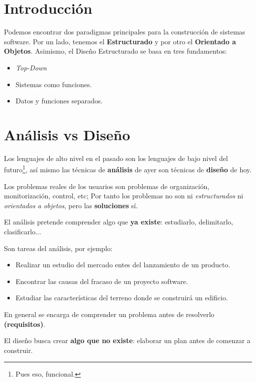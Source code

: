 

\section{Introducción}

Podemos encontrar dos paradigmas principales para la construcción de sistemas
software. Por un lado, tenemos el \textbf{Estructurado} y por otro el
\textbf{Orientado a Objetos}. Asimismo, el Diseño Estructurado se basa en tres
fundamentos:

\begin{itemize}[noitemsep]
\item \emph{Top-Down}
\item Sistemas como funciones.
\item Datos y funciones separados.
\end{itemize}


\section{Análisis vs Diseño}

Los lenguajes de alto nivel en el pasado son los lenguajes de bajo nivel del futuro\footnote{Pues eso, funcional.}, así mismo las técnicas de \textbf{análisis} de ayer son técnicas de \textbf{diseño} de hoy.

Los problemas reales de los usuarios son problemas de organización, monitorización, control, etc; Por tanto los problemas no son ni \textit{estructurados} ni \textit{orientados a objetos}, pero las \textbf{soluciones} sí.

El análisis pretende comprender algo que \textbf{ya existe}: estudiarlo, delimitarlo, clasificarlo...

Son tareas del análisis, por ejemplo:

\begin{itemize}[noitemsep]
\item Realizar un estudio del mercado entes del lanzamiento de un producto.
\item Encontrar las causas del fracaso de un proyecto software.
\item Estudiar las características del terreno donde se construirá un edificio.
\end{itemize}

En general se encarga de comprender un problema antes de resolverlo \textbf{(requisitos)}.

El diseño busca crear \textbf{algo que no existe}: elaborar un plan antes de comenzar a construir.

